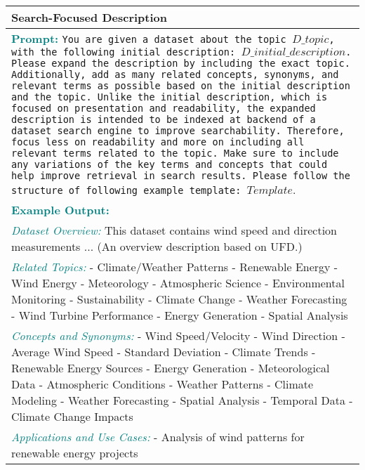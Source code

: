 \begin{table}
    \small
    \centering
    \begin{tabular}{p{8.1cm}}
    \toprule
    \textbf{Search-Focused Description} \\
    \midrule
    \textcolor{teal}{\textbf{Prompt:}} 
    \texttt{You are given a dataset about the topic $D\_topic$, with the following initial description: $D\_initial\_description$.
    Please expand the description by including the exact topic. Additionally, add as many related concepts, synonyms, and relevant terms as possible based on the initial description and the topic.
    Unlike the initial description, which is focused on presentation and readability, the expanded description is intended to be indexed at backend of a dataset search engine to improve searchability.
    Therefore, focus less on readability and more on including all relevant terms related to the topic. Make sure to include any variations of the key terms and concepts that could help improve retrieval in search results.
    Please follow the structure of following example template: $Template$}.\\
    \midrule
    \textcolor{teal}{\textbf{Example Output:}} \\
    \textcolor{teal}{\textit{Dataset Overview:}} This dataset contains wind speed and direction measurements ... (An overview description based on UFD.)
    \\
    \textcolor{teal}{\textit{Related Topics:}}
    - Climate/Weather Patterns
    - Renewable Energy
    - Wind Energy
    - Meteorology
    - Atmospheric Science
    - Environmental Monitoring
    - Sustainability
    - Climate Change
    - Weather Forecasting
    - Wind Turbine Performance
    - Energy Generation
    - Spatial Analysis
    \\
    \textcolor{teal}{\textit{Concepts and Synonyms:}}
    - Wind Speed/Velocity
    - Wind Direction
    - Average Wind Speed
    - Standard Deviation
    - Climate Trends
    - Renewable Energy Sources
    - Energy Generation
    - Meteorological Data
    - Atmospheric Conditions
    - Weather Patterns
    - Climate Modeling
    - Weather Forecasting
    - Spatial Analysis
    - Temporal Data
    - Climate Change Impacts
    \\
    \textcolor{teal}{\textit{Applications and Use Cases:}}
    - Analysis of wind patterns for renewable energy projects

\end{tabular}
\end{table}
